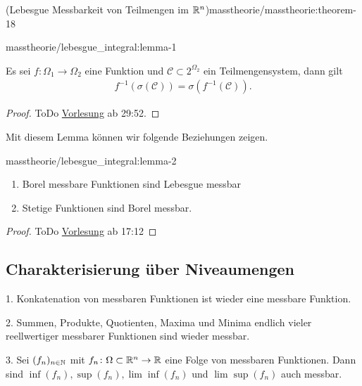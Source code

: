 \begin{theorem}{(Lebesgue Messbarkeit von Teilmengen im \protect\(\mathbb{R}^n\protect\))}{masstheorie/masstheorie:theorem-18}
\begin{lemma}{}{masstheorie/lebesgue_integral:lemma-1}
\par
Es sei \(f:\Omega_1\to\Omega_2\) eine Funktion und \(\mathcal{C}\subset 2^{\Omega_2}\) ein Teilmengensystem, dann gilt
\begin{align*}
f^{-1}(\sigma(\mathcal{C})) = \sigma(f^{-1}(\mathcal{C})).
\end{align*}\end{lemma}

\begin{proof}
 ToDo
\href{https://www.fau.tv/clip/id/40563}{Vorlesung} ab 29:52.
\end{proof}

\par
Mit diesem Lemma können wir folgende Beziehungen zeigen.
\begin{lemma}{}{masstheorie/lebesgue_integral:lemma-2}


\begin{enumerate}

\item {} 
\par
Borel messbare Funktionen sind Lebesgue messbar

\item {} 
\par
Stetige Funktionen sind Borel messbar.

\end{enumerate}
\end{lemma}

\begin{proof}
 ToDo
\href{https://www.fau.tv/clip/id/40563}{Vorlesung} ab 17:12
\end{proof}


\subsection{Charakterisierung über Niveaumengen}
\begin{remark}{}{}\label{masstheorie/lebesgue_integral:remark-3}



\par
1. Konkatenation von messbaren Funktionen ist wieder eine messbare Funktion.

\par
2. Summen, Produkte, Quotienten, Maxima und Minima endlich vieler reellwertiger messbarer Funktionen sind wieder messbar.

\par
3. Sei \((f_n)_{n \in \mathbb{N}}\) mit \(f_n \colon \Omega \subset \mathbb{R}^n \rightarrow \mathbb{R}\) eine Folge von messbaren Funktionen.
Dann sind \(\inf(f_n), \sup(f_n), \lim\inf (f_n)\) und \(\lim\sup (f_n)\) auch messbar.
\end{remark}



\end{theorem}
